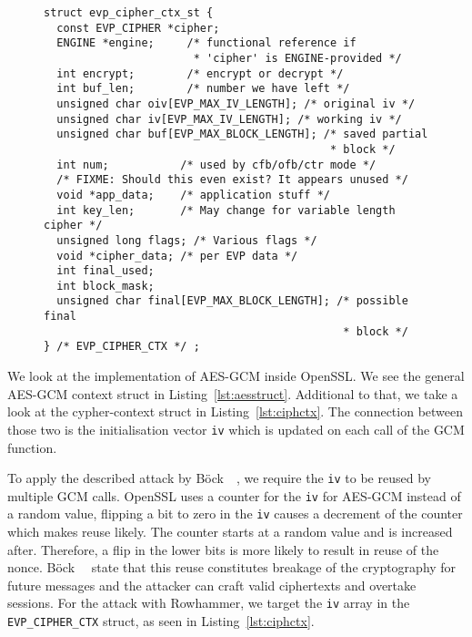 \begin{figure}
\begin{minipage}{\linewidth}
\begin{lstlisting}[style=CStyle,
                   caption={Context struct describing the Cipher used in TLS.
This struct is used as the SSL context inside OpenSSL. Source is taken from
OpenSSL version $1.1.0g$},
                   label={lst:ciphctx}]
struct evp_cipher_ctx_st {
  const EVP_CIPHER *cipher;
  ENGINE *engine;     /* functional reference if
                       * 'cipher' is ENGINE-provided */
  int encrypt;        /* encrypt or decrypt */
  int buf_len;        /* number we have left */
  unsigned char oiv[EVP_MAX_IV_LENGTH]; /* original iv */
  unsigned char iv[EVP_MAX_IV_LENGTH]; /* working iv */
  unsigned char buf[EVP_MAX_BLOCK_LENGTH]; /* saved partial
                                            * block */
  int num;           /* used by cfb/ofb/ctr mode */
  /* FIXME: Should this even exist? It appears unused */
  void *app_data;    /* application stuff */
  int key_len;       /* May change for variable length cipher */
  unsigned long flags; /* Various flags */
  void *cipher_data; /* per EVP data */
  int final_used;
  int block_mask;
  unsigned char final[EVP_MAX_BLOCK_LENGTH]; /* possible final
                                              * block */
} /* EVP_CIPHER_CTX */ ;
\end{lstlisting}
\end{minipage}
\end{figure}

We look at the implementation of AES-GCM inside OpenSSL. We see the general
AES-GCM context struct in Listing~\ref{lst:aesstruct}. Additional to that, we
take a look at the cypher-context struct in Listing~\ref{lst:ciphctx}. The
connection between those two is the initialisation vector \texttt{iv} which is
updated on each call of the GCM function.

To apply the described attack by Böck~\etal~\cite{gcmnonceattack}, we require
the \texttt{iv} to be reused by multiple GCM calls. OpenSSL uses a counter for
the \texttt{iv} for AES-GCM instead of a random value, flipping a bit to zero in
the \texttt{iv} causes a decrement of the counter which makes reuse likely. The
counter starts at a random value and is increased after. Therefore, a flip in
the lower bits is more likely to result in reuse of the nonce.
Böck~\etal~\cite{gcmnonceattack} state that this reuse constitutes breakage of
the cryptography for future messages and the attacker can craft valid
ciphertexts and overtake sessions. For the attack with Rowhammer, we target the
\texttt{iv} array in the \texttt{EVP\_CIPHER\_CTX} struct, as seen in
Listing~\ref{lst:ciphctx}.

